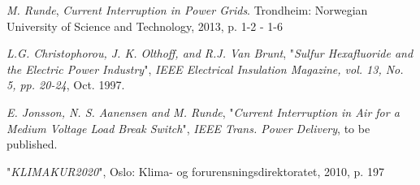 \documentclass[10pt,a4paper]{article}
\begin{document}
\begin{thebibliography}{10}


 \textit{M. Runde}, \textit{Current Interruption in Power Grids}. Trondheim: Norwegian University of Science and Technology, 2013, p. 1-2 - 1-6

 \textit{L.G. Christophorou, J. K. Olthoff, and R.J. Van Brunt}, "\textit{Sulfur Hexafluoride and the Electric Power Industry}", \textit{IEEE Electrical Insulation Magazine, vol. 13, No. 5, pp. 20-24}, Oct. 1997.

 \textit{E. Jonsson, N. S. Aanensen and M. Runde}, "\textit{Current Interruption in Air for a Medium Voltage Load Break Switch}", \textit{IEEE Trans. Power Delivery}, to be published.

 "\textit{KLIMAKUR2020}", Oslo: Klima- og forurensningsdirektoratet, 2010, p. 197
\end{thebibliography}
\end{document}
